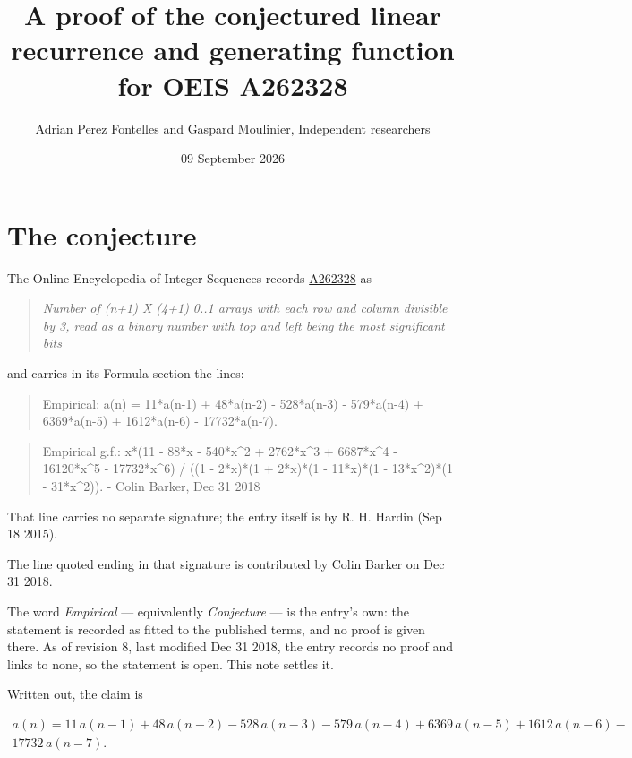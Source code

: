 \documentclass[11pt]{article}
\title{A proof of the conjectured linear recurrence and generating function for OEIS A262328}
\author{Adrian Perez Fontelles and Gaspard Moulinier, Independent researchers}
\date{09 September 2026}
\theoremstyle{definition}
\begin{document}
\maketitle
\section{The conjecture}

The Online Encyclopedia of Integer Sequences records \href{https://oeis.org/A262328}{A262328} as

\begin{quote}\itshape Number of (n+1) X (4+1) 0..1 arrays with each row and column divisible by 3, read as a binary number with top and left being the most significant bits\end{quote}

and carries in its Formula section the lines:

\begin{quote}\ttfamily Empirical: a(n) = 11*a(n-1) + 48*a(n-2) - 528*a(n-3) - 579*a(n-4) + 6369*a(n-5) + 1612*a(n-6) - 17732*a(n-7).\end{quote}

\begin{quote}\ttfamily Empirical g.f.: x*(11 - 88*x - 540*x\textasciicircum{}2 + 2762*x\textasciicircum{}3 + 6687*x\textasciicircum{}4 - 16120*x\textasciicircum{}5 - 17732*x\textasciicircum{}6) / ((1 - 2*x)*(1 + 2*x)*(1 - 11*x)*(1 - 13*x\textasciicircum{}2)*(1 - 31*x\textasciicircum{}2)). - Colin Barker, Dec 31 2018\end{quote}

That line carries no separate signature; the entry itself is by R. H. Hardin (Sep 18 2015).

The line quoted ending in that signature is contributed by Colin Barker on Dec 31 2018.

The word {\itshape Empirical} --- equivalently {\itshape Conjecture} --- is the entry's own: the statement is recorded as fitted to the published terms, and no proof is given there. As of revision 8, last modified Dec 31 2018, the entry records no proof and links to none, so the statement is open. This note settles it.

Written out, the claim is

\begin{multline*} a(n) = 11\,a(n-1) + 48\,a(n-2) - 528\,a(n-3) - 579\,a(n-4) + 6369\,a(n-5) + 1612\,a(n-6) - \\ 17732\,a(n-7). \end{multline*}
\end{document}
